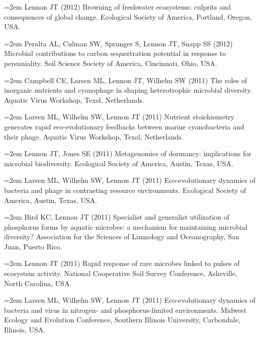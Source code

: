 \documentclass[11pt]{article}
\begin{document}
{\hangindent=2em Lennon JT (2012) Browning of freshwater ecosystems: culprits and consequences of global change. Ecological Society of America, Portland, Oregon, USA. \par

\hangindent=2em Peralta AL, Culman SW, Sprunger S, Lennon JT, Snapp SS (2012) Microbial contributions to carbon sequestration potential in response to perenniality. Soil Science Society of America, Cincinnati, Ohio, USA. \par

\hangindent=2em Campbell CE, Larsen ML, Lennon JT, Wilhelm SW (2011) The roles of inorganic nutrients and cyanophage in shaping heterotrophic microbial diversity. Aquatic Virus Workshop, Texel, Netherlands. \par

\hangindent=2em Larsen ML, Wilhelm SW, Lennon JT (2011) Nutrient stoichiometry generates rapid eco-evolutionary feedbacks between marine cyanobacteria and their phage. Aquatic Virus Workshop, Texel, Netherlands. \par

\hangindent=2em Lennon JT, Jones SE (2011) Metagenomics of dormancy: implications for microbial biodiversity. Ecological Society of America, Austin, Texas, USA. \par

\hangindent=2em Larsen ML, Wilhelm SW, Lennon JT (2011) Eco-evolutionary dynamics of bacteria and phage in contrasting resource environments. Ecological Society of America, Austin, Texas, USA. \par

\hangindent=2em Bird KC, Lennon JT (2011) Specialist and generalist utilization of phosphorus forms by aquatic microbes: a mechanism for maintaining microbial diversity? Association for the Sciences of Limnology and Oceanography, San Juan, Puerto Rico. \par

\hangindent=2em Lennon JT (2011) Rapid response of rare microbes linked to pulses of ecosystem activity. National Cooperative Soil Survey Conference, Asheville, North Carolina, USA. \par

\hangindent=2em Larsen ML, Wilhelm SW, Lennon JT (2011) Eco-evolutionary dynamics of bacteria and virus in nitrogen- and phosphorus-limited environments. Midwest Ecology and Evolution Conference, Southern Illinois University, Carbondale, Illinois, USA. \par

}
\end{document}
